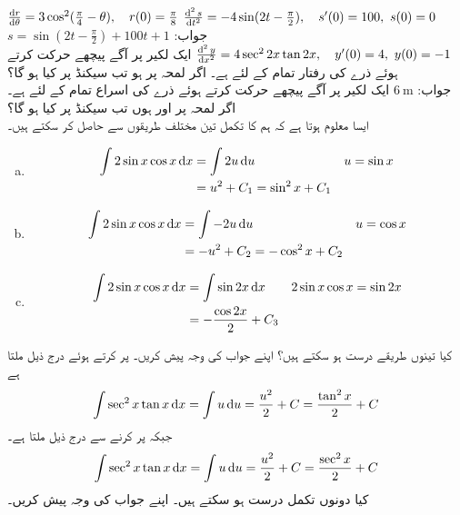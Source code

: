 $\tfrac{\dif r}{\dif \theta}=3\cos^2(\tfrac{\pi}{4}-\theta),\quad r(0)=\tfrac{\pi}{8}$
$\tfrac{\dif^{\,2}s}{\dif t^2}=-4\sin(2t-\tfrac{\pi}{2}),\quad s'(0)=100,\,\, s(0)=0$\\
جواب:\quad
$s=\sin(2t-\tfrac{\pi}{2})+100t+1$
$\tfrac{\dif^{\,2} y}{\dif x^2}=4\sec^22x\tan 2x,\quad y'(0)=4,\,\,y(0)=-1$
ایک لکیر پر آگے پیچھے حرکت کرتے ہوئے ذرے کی رفتار تمام  کے لئے  ہے۔ اگر لمحہ  پر  ہو تب  سیکنڈ  پر  کیا ہو گا؟\\
جواب:\quad
$\SI{6}{\meter}$
ایک لکیر پر آگے پیچھے حرکت کرتے ہوئے ذرے کی اسراع تمام  کے لئے  ہے۔ اگر لمحہ  پر  اور  ہوں تب  سیکنڈ  پر  کیا ہو گا؟
\\
ایسا معلوم ہوتا ہے کہ ہم  کا تکمل تین مختلف طریقوں سے حاصل کر سکتے ہیں۔
\begin{enumerate}[a.]
\item
\begin{align*}
\int 2\sin x\cos x\dif x&=\int 2u\dif u&&u=\sin x\\
&=u^2+C_1=\sin^2x+C_1
\end{align*}
\item
\begin{align*}
\int 2\sin x\cos x\dif x&=\int -2u\dif u&&u=\cos x\\
&=-u^2+C_2=-\cos^2x+C_2
\end{align*}
\item
\begin{align*}
\int 2\sin x\cos x\dif x&=\int \sin 2x\dif x&&2\sin x\cos x=\sin 2x\\
&=-\frac{\cos 2x}{2}+C_3
\end{align*}
\end{enumerate}
کیا تینوں طریقے درست ہو سکتے ہیں؟ اپنے جواب کی وجہ پیش کریں۔ 
 پر کرتے ہوئے درج ذیل ملتا ہے
\begin{align*}
\int \sec^2x\tan x\dif x=\int u\dif u=\frac{u^2}{2}+C=\frac{\tan^2 x}{2}+C
\end{align*}
جبکہ  پر کرنے سے درج ذیل ملتا ہے۔
\begin{align*}
\int \sec^2x\tan x\dif x=\int u\dif u=\frac{u^2}{2}+C=\frac{\sec^2x}{2}+C
\end{align*}
کیا دونوں تکمل درست ہو سکتے ہیں۔ اپنے جواب کی وجہ پیش کریں۔

